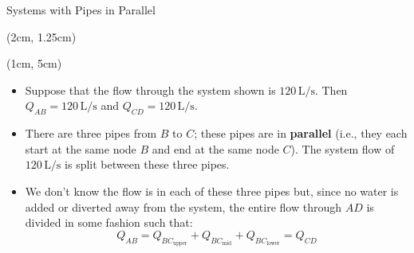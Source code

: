\documentclass[9pt,xcolor={svgnames, x11names},mathpazo, professionalfonts]{beamer}
\begin{document}
\begin{frame}
	
	\parb
	
\end{frame}

\begin{frame}
	
	\parb
	
\end{frame}

%
\begin{frame}{Systems with Pipes in Parallel}
	
	\begin{textblock*}{0.75\columnwidth}(2cm, 1.25cm)
	\end{textblock*}
	
	\begin{textblock*}{1\columnwidth}(1cm, 5cm)
		\begin{itemize}
			\item Suppose that the flow through the system shown is $120\,\text{L/s}$. Then $Q_{AB}=120\,\text{L/s}$ and $Q_{CD}=120\,\text{L/s}$.\par
			\item There are three pipes from $B$ to $C$; these pipes are in {\bfseries parallel} (i.e., they each start at the same node $B$ and end at the same node $C$). The system flow of $120\,\text{L/s}$ is split between these three pipes. \par
			\item 	We don't know the flow is in each of these three pipes but, since no water is added or diverted away from the system, the entire flow
			      through $AD$ is divided in some fashion such that:
			      \vspace{-0.25cm}
			      \[ Q_{AB} = Q_{BC_\text{upper}} +  Q_{BC_\text{mid}}+ Q_{BC_\text{lower}} = Q_{CD} \]
		\end{itemize}
		
		
		
	\end{textblock*}
\end{frame}
\end{document}
